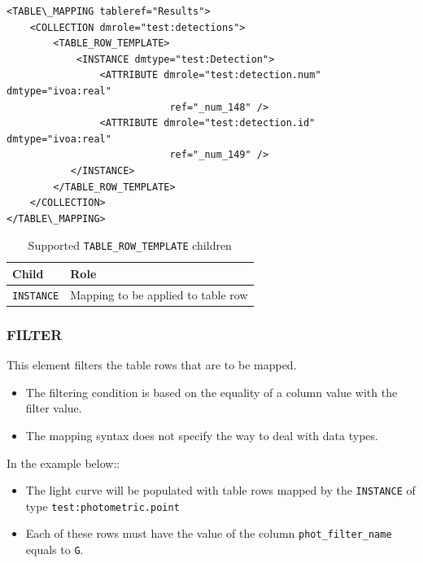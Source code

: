 \documentclass[11pt,a4paper]{ivoa}
\begin{document}
\begin{lstlisting}[caption={TABLE\_ROW\_TEMPLATE examples},style=XML]
<TABLE\_MAPPING tableref="Results">
    <COLLECTION dmrole="test:detections">
        <TABLE_ROW_TEMPLATE>
            <INSTANCE dmtype="test:Detection">
                <ATTRIBUTE dmrole="test:detection.num" dmtype="ivoa:real"
                            ref="_num_148" />
                <ATTRIBUTE dmrole="test:detection.id" dmtype="ivoa:real"
                            ref="_num_149" />
           </INSTANCE>
        </TABLE_ROW_TEMPLATE>
    </COLLECTION>
</TABLE\_MAPPING>
\end{lstlisting}

\begin{table}[!htbp]
\small
\centering
\begin{tabulary}{\linewidth}{|L|J|}
       \hline  
          \textbf{Child} &  
          \textbf{Role}\\
       \hline  
          \texttt{INSTANCE}    & 
          Mapping to be applied to table row \\       
       \hline 
     \end{tabulary}
     \caption{Supported  \texttt{TABLE\_ROW\_TEMPLATE} children} 
     \label{trt:row-children}
\end{table}
\FloatBarrier


%
%

\subsubsection{FILTER}
This element filters the table rows that are to be mapped. 

\begin{itemize}
   \item The filtering condition is based on the equality of a column value with the filter value.
   \item The mapping syntax does not specify the way to deal with data types.
\end{itemize}

In the example below::

\begin{itemize}
   \item The light curve will be populated with table rows mapped by the \texttt{INSTANCE} of type \texttt{test:photometric.point}
   \item Each of these rows must have the value of the column \texttt{phot\_filter\_name} equals to \texttt{G}.
\end{itemize}
\end{document}
